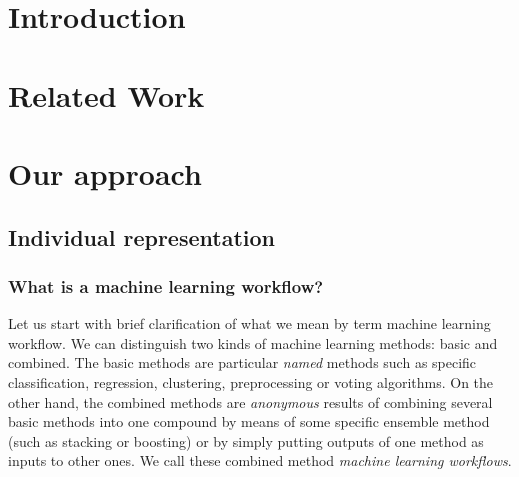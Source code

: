 \documentclass{ws-ijait}
\begin{document}
\newcommand{\Pseudokod}[4]{
	\begin{figure}[!t]
	\removelatexerror
	\begin{algorithm}[H]
		\caption{\label{#4}#1}
		\DontPrintSemicolon
		\SetKwProg{Fn}{function}{}{}
		\Fn{#2}{#3}
	\end{algorithm}
	\end{figure}
}

\makeatletter
\newcommand{\removelatexerror}{\let\@latex@error\@gobble}
\makeatother

\maketitle

\begin{history}
\end{history}

\begin{abstract}
\end{abstract}


\section{Introduction}	

\section{Related Work}


\section{Our approach}




\subsection{Individual representation}

\subsubsection{What is a machine learning workflow?}
Let us start with brief clarification of what we mean by term machine learning workflow. We can distinguish two kinds of machine learning methods: basic and combined. The basic methods are particular \textit{named} methods such as specific classification, regression, clustering, preprocessing or voting algorithms. On the other hand, the combined methods are \textit{anonymous} results of combining several basic methods into one compound by means of some specific ensemble method (such as stacking or boosting) or by simply putting outputs of one method as inputs to other ones. We call these combined method \textit{machine learning workflows}.
\end{document}
